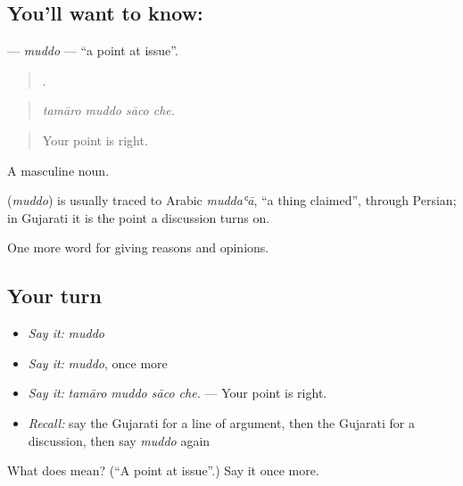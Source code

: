 \subsection*{You'll want to know: }
\textbf{} — \emph{muddo} — \textquotedblleft{}a point at issue\textquotedblright{}.

\begin{quote}
   .
\end{quote}

\begin{quote}
\emph{tamāro muddo sāco che.}
\end{quote}

\begin{quote}
Your point is right.
\end{quote}

A masculine noun.

\begin{cousinweb}
\textbf{} (\emph{muddo}) is usually traced to Arabic \emph{muddaʿā}, \textquotedblleft{}a thing claimed\textquotedblright{}, through Persian; in Gujarati it is the point a discussion turns on.
\end{cousinweb}

\begin{grammarlens}[title={What you've built}]
One more word for giving reasons and opinions.
\end{grammarlens}

\subsection*{Your turn}
\begin{itemize}
\raggedright
  \item \emph{Say it:} \emph{muddo}
  \item \emph{Say it:} \emph{muddo}, once more
  \item \emph{Say it:} \emph{tamāro muddo sāco che.} — Your point is right.
  \item \emph{Recall:} say the Gujarati for a line of argument, then the Gujarati for a discussion, then say \emph{muddo} again
\end{itemize}

\begin{tcolorbox}[breakable,colback=teal!4,colframe=teal!35!black,title={Before you move on}]
What does  mean? (\textquotedblleft{}A point at issue\textquotedblright{}.) Say it once more.
\end{tcolorbox}
